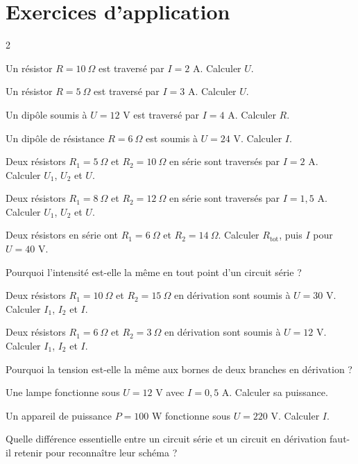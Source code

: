 \section{Exercices d'application}
\begin{multicols}{2}

\exo{} Un résistor $R=10\ \Omega$ est traversé par $I=2$ A. Calculer $U$.

\exo{} Un résistor $R=5\ \Omega$ est traversé par $I=3$ A. Calculer $U$.

\exo{} Un dipôle soumis à $U=12$ V est traversé par $I=4$ A. Calculer $R$.

\exo{} Un dipôle de résistance $R=6\ \Omega$ est soumis à $U=24$ V. Calculer $I$.

\exo{} Deux résistors $R_1=5\ \Omega$ et $R_2=10\ \Omega$ en série sont traversés
par $I=2$ A. Calculer $U_1$, $U_2$ et $U$.

\exo{} Deux résistors $R_1=8\ \Omega$ et $R_2=12\ \Omega$ en série sont traversés
par $I=1{,}5$ A. Calculer $U_1$, $U_2$ et $U$.

\exo{} Deux résistors en série ont $R_1=6\ \Omega$ et $R_2=14\ \Omega$. Calculer
$R_{\text{tot}}$, puis $I$ pour $U=40$ V.

\exo{} Pourquoi l'intensité est-elle la même en tout point d'un circuit série ?

\exo{} Deux résistors $R_1=10\ \Omega$ et $R_2=15\ \Omega$ en dérivation sont
soumis à $U=30$ V. Calculer $I_1$, $I_2$ et $I$.

\exo{} Deux résistors $R_1=6\ \Omega$ et $R_2=3\ \Omega$ en dérivation sont soumis
à $U=12$ V. Calculer $I_1$, $I_2$ et $I$.

\exo{} Pourquoi la tension est-elle la même aux bornes de deux branches en
dérivation ?

\exo{} Une lampe fonctionne sous $U=12$ V avec $I=0{,}5$ A. Calculer sa puissance.

\exo{} Un appareil de puissance $P=100$ W fonctionne sous $U=220$ V. Calculer $I$.

\exo{} Quelle différence essentielle entre un circuit série et un circuit en
dérivation faut-il retenir pour reconnaître leur schéma ?

\end{multicols}

